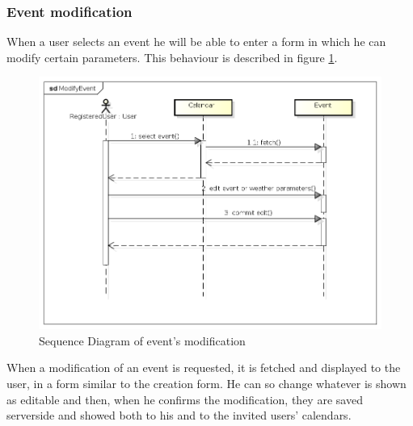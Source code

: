 \subsubsection{Event modification}
When a user selects an event he will be able to enter a form in which he can modify certain parameters. This behaviour is described in figure \ref{fig:modseqdiag}.
\begin{center}
 \begin{figure}[H]
    \includegraphics[width=1\textwidth]{../UMLDiagram/sequence/ModifyEvent/ModifyEvent.png}
    \caption{Sequence Diagram of event's modification}
     \label{fig:modseqdiag}
     \end{figure}
   \end{center}
When a modification of an event is requested, it is fetched and displayed to the user, in a form similar to the creation form. He can so change whatever is shown as editable and then, when he confirms the modification, they are saved serverside and showed both to his and to the invited users' calendars.
